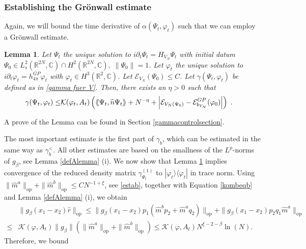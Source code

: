 \documentclass[11pt, english, american]{article}
\newcommand{\laa}{\langle\hspace{-0.08cm}\langle}
\newcommand{\raa}{\rangle\hspace{-0.08cm}\rangle}
\newtheorem{lemma}[theorem]{Lemma}
\renewcommand{\phi}{\varphi}
\begin{document}
\subsubsection{Establishing the Gr\"onwall estimate}
Again, we will bound the time derivative of $\alpha(\Psi_t,\phi_t)$ such that we can employ a Gr\"onwall estimate.
\begin{lemma} \label{gammalemma fuer V}
Let $\Psi_t$ the unique solution to $i \partial_t \Psi_t
= H_{V_N} \Psi_t$ with initial datum 
$\Psi_0 \in L^2_{s}(\mathbb{R}^{2N}, \mathbb{C}) \cap H^2(\mathbb{R}^{2N}, \mathbb{C}) ,\; \|\Psi_0\|=1$.  
Let $\phi_t$ the unique solution to $i \partial_t \phi_t
= h^{GP}_{4 \pi} \phi_t$ with $\phi_t \in H^{3}(\mathbb{R}^2,\mathbb{C})$.
Let $\mathcal{E}_{V_N}(\Psi_0) \leq C$.
Let $\gamma(\Psi_t,\phi_t)$ be defined as in \eqref{gamma fuer V}.
Then, there exists an $\eta>0$ such that
\begin{align} 
\label{theoremeq1 fuer V}
\gamma(\Psi_t,\phi_t) \leq &
 \mathcal{K}(\phi_t, A_t)
\left(
	 \laa\Psi_t,\widehat{n}\Psi_t\raa + N^{-\eta}+
	\left|
	\mathcal{E}_{V_N(\Psi_0)}
-
\mathcal{E}_{b_{V_N}}^ {GP}(\phi_0)
\right|
 \right)
 \;.
\end{align}
\end{lemma}
A prove of the Lemma can be found in Section \ref{gammacontrolsection}.

 The most important estimate is the first part of $\gamma_b$, which can be estimated in the same way as $\gamma_b^<$.
 All other estimates are based on the smallness of the $L^p$-norms of $g_{\beta}$, see Lemma \ref{defAlemma} (i).
 We now show that Lemma \ref{gammalemma fuer V} implies convergence of the  reduced density matrix
 $\gamma^{(1)}_{\Psi_t}$ to $|\phi_t \rangle \langle \phi_t|$ in trace norm.
 Using $\| \widehat{m}^a\|_{\text{op}}
 +
 \| \widehat{m}^b\|_{\text{op}} \leq C N^{-1+\xi}$, see \eqref{estab}, together with Equation \eqref{kombeqb} and Lemma \ref{defAlemma} (i), we obtain
\begin{align*}
& \|g_{\beta}(x_{1}-x_{2}) \widehat{r}\|_{\text{op}}
 \leq
 \|g_{\beta}(x_{1}-x_{2})p_1( 
 \widehat{m}^b p_2+
 \widehat{m}^a q_2)
 \|_{\text{op}}
 +
 \|g_{\beta}(x_{1}-x_{2}) p_2
q_1 
 \widehat{m}^a\|_{\text{op}}
\\
 \leq&
 \mathcal{K}(\phi, A_t)
  \|g_{\beta} \|
 (
 \| \widehat{m}^a\|_{\text{op}}
 +
 \| \widehat{m}^b\|_{\text{op}}
 )
 \leq 
 \mathcal{K}(\phi, A_t) 
 N^{\xi-2- \beta} \ln(N)
 .
\end{align*}
Therefore, we bound
  
\end{document}
